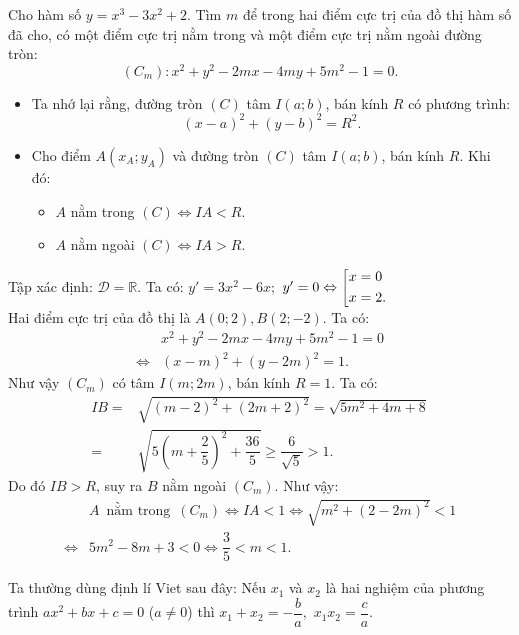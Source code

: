 \begin{bt}%
	Cho hàm số $y=x^3-3x^2+2$. Tìm $m$ để trong hai điểm cực trị của đồ thị hàm số đã cho, có một điểm cực trị nằm trong và một điểm cực trị nằm ngoài đường tròn:
	$$(C_m): x^2+y^2-2mx-4my+5m^2-1=0.$$
	\loigiai
	{
		\begin{itemize}
			\item Ta nhớ lại rằng, đường tròn $(C)$ tâm $I(a; b)$, bán kính $R$ có phương trình:
			$$(x-a)^2+(y-b)^2=R^2.$$
			\item Cho điểm $A(x_A; y_A)$ và đường tròn $(C)$ tâm $I(a; b)$, bán kính $R$. Khi đó:
			\begin{itemize}
				\item $A$ nằm trong $(C)\Leftrightarrow IA<R$.
				\item $A$ nằm ngoài $(C)\Leftrightarrow IA>R$.
			\end{itemize}
		\end{itemize}
		  Tập xác định: $\mathscr{D}=\mathbb{R}$. Ta có:
		$y'=3x^2-6x$;\;\ $y' = 0 \Leftrightarrow \left[\begin{aligned}&x = 0\\&x = 2.\end{aligned}\right.$\\
		Hai điểm cực trị của đồ thị là $A(0;2), B(2;-2)$.
		Ta có:
		\begin{align*}
		&x^2+y^2-2mx-4my+5m^2-1=0\\
		\Leftrightarrow &(x-m)^2+(y-2m)^2=1.
		\end{align*}
		Như vậy $(C_m)$ có tâm $I(m; 2m)$, bán kính $R=1$.
		Ta có:
		{\allowdisplaybreaks
			\begin{align*}
			IB=&\sqrt{(m-2)^2+(2m+2)^2}=\sqrt{5m^2+4m+8}\\
			=&\sqrt{5\left(m+\dfrac{2}{5}\right)^2+\dfrac{36}{5}}\ge \dfrac{6}{\sqrt 5}>1.
			\end{align*}}
		Do đó $IB>R$, suy ra $B$ nằm ngoài $(C_m)$.
		Như vậy:
		{\allowdisplaybreaks
			\begin{align*}
			&A\;\ \text{nằm trong}\;\ (C_m)\Leftrightarrow IA<1\Leftrightarrow \sqrt{m^2+(2-2m)^2}<1\\
			\Leftrightarrow &5m^2-8m+3<0\Leftrightarrow \dfrac{3}{5}<m<1.
			\end{align*}}
	}
\end{bt}
\begin{note} Ta thường dùng định lí Viet sau đây: Nếu  $x_1$ và $x_2$ là hai nghiệm của phương trình $ax^2+bx+c=0$ ($a\ne0$) thì
	${x_1} + {x_2} =  - \dfrac{b}{a},\,\,{x_1}{x_2} = \dfrac{c}{a}$.
\end{note}

